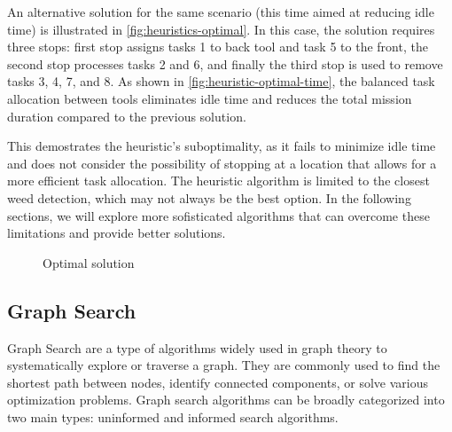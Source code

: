 An alternative solution for the same scenario (this time aimed at reducing idle time) is illustrated in \autoref{fig:heuristics-optimal}. In this case, the solution requires three stops: first stop assigns tasks 1 to back tool and task 5 to the front, the second stop processes tasks 2 and 6, and finally the third stop is used to remove tasks 3, 4, 7, and 8. As shown in \autoref{fig:heuristic-optimal-time}, the balanced task allocation between tools eliminates idle time and reduces the total mission duration compared to the previous solution.

This demostrates the heuristic's suboptimality, as it fails to minimize idle time and does not consider the possibility of stopping at a location that allows for a more efficient task allocation. The heuristic algorithm is limited to the closest weed detection, which may not always be the best option. In the following sections, we will explore more sofisticated algorithms that can overcome these limitations and provide better solutions. 

\begin{figure}[hbt]
    \myfloatalign


    \caption{Optimal solution}
    \label{fig:heuristics-optimal}
\end{figure}

\subsection{Graph Search}
Graph Search are a type of algorithms widely used in graph theory to systematically explore or traverse a graph. They are commonly used to find the shortest path between nodes, identify connected components, or solve various optimization problems. Graph search algorithms can be broadly categorized into two main types: uninformed and informed search algorithms.

